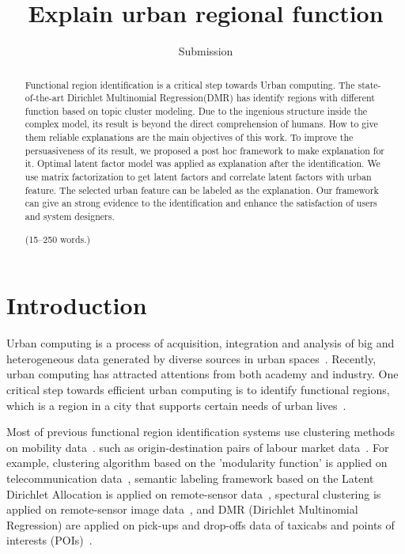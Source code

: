 \documentclass[runningheads]{llncs}
\begin{document}
\title{Explain urban regional function}
\author{Submission}

\maketitle

\begin{abstract}
Functional region identification is a critical step towards Urban computing.
The state-of-the-art Dirichlet Multinomial Regression(DMR) has identify regions with different function based on topic cluster modeling.
Due to the ingenious structure inside the complex model, its result is beyond the direct comprehension of humans.
How to give them reliable explanations are the main objectives of this work.
To improve the persuasiveness of its result, we proposed a post hoc framework to make explanation for it.
Optimal latent factor model was applied as explanation after the identification.
We use matrix factorization to get latent factors and correlate latent factors with urban feature.
The selected urban feature can be labeled as the explanation.
Our framework can give an strong evidence to the identification and enhance the satisfaction of users and system designers.

(15--250 words.)

\end{abstract}
%


\section{Introduction}
Urban computing is a process of acquisition, integration and analysis of big and heterogeneous data generated by diverse sources in urban spaces~\cite{Zheng2014UrbanConcepts}. 
Recently, urban computing has attracted attentions from both academy and industry.
One critical step towards efficient urban computing is to identify functional regions, which is a region in a city that supports certain needs of urban lives~\cite{Yuan2012FunctionRegion,Yuan2015FunctionRegion}.

Most of previous functional region identification systems use clustering methods on mobility data~\cite{Karlsson2006FunctionalRegionSummary}. such as origin-destination pairs of labour market data~\cite{Karlsson2006FunctionalRegionSummary}.
For example, clustering algorithm based on the 'modularity function' is applied on telecommunication data~\cite{Newman2004ModularityFunction,Ratti2010Telecom}, semantic labeling framework based on the Latent Dirichlet Allocation is applied on remote-sensor data~\cite{Vatsavai2010Remote}, spectural clustering is applied on remote-sensor image data~\cite{Vatsavai2011Remote}, and DMR (Dirichlet Multinomial Regression) are applied on pick-ups and drop-offs data of taxicabs and points of interests (POIs)~\cite{Yuan2012FunctionRegion,Yuan2015FunctionRegion}.
\end{document}
